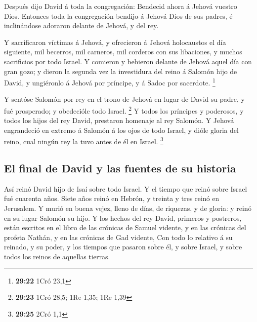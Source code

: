 Después dijo David á toda la congregación: Bendecid
ahora á Jehová vuestro Dios. Entonces toda la congregación bendijo á
Jehová Dios de sus padres, é inclinándose adoraron delante de Jehová, y
del rey.

 Y sacrificaron víctimas á Jehová, y ofrecieron á Jehová
holocaustos el día siguiente, mil becerros, mil carneros, mil corderos
con sus libaciones, y muchos sacrificios por todo Israel.
 Y comieron y bebieron delante de Jehová aquel día con
gran gozo; y dieron la segunda vez la investidura del reino á Salomón
hijo de David, y ungiéronlo á Jehová por príncipe, y á Sadoc por
sacerdote. \footnote{\textbf{29:22} 1Cró 23,1}

 Y sentóse Salomón por rey en el trono de Jehová en lugar
de David su padre, y fué prosperado; y obedecióle todo Israel.
\footnote{\textbf{29:23} 1Cró 28,5; 1Re 1,35; 1Re 1,39} 
Y todos los príncipes y poderosos, y todos los hijos del rey David,
prestaron homenaje al rey Salomón.  Y Jehová engrandeció
en extremo á Salomón á los ojos de todo Israel, y dióle gloria del
reino, cual ningún rey la tuvo antes de él en Israel. \footnote{\textbf{29:25}
  2Cró 1,1}

\hypertarget{el-final-de-david-y-las-fuentes-de-su-historia}{%
\subsection{El final de David y las fuentes de su
historia}\label{el-final-de-david-y-las-fuentes-de-su-historia}}

 Así reinó David hijo de Isaí sobre todo Israel.
 Y el tiempo que reinó sobre Israel fué cuarenta años.
Siete años reinó en Hebrón, y treinta y tres reinó en Jerusalem.
 Y murió en buena vejez, lleno de días, de riquezas, y de
gloria: y reinó en su lugar Salomón su hijo.  Y los
hechos del rey David, primeros y postreros, están escritos en el libro
de las crónicas de Samuel vidente, y en las crónicas del profeta Nathán,
y en las crónicas de Gad vidente,  Con todo lo relativo á
su reinado, y su poder, y los tiempos que pasaron sobre él, y sobre
Israel, y sobre todos los reinos de aquellas tierras.
